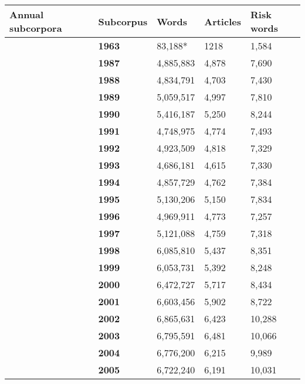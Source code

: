 	\begin{table}
	    \centering
	    \footnotesize
    \begin{tabular}{p{1.5cm}|l|l|l|l|}

\hline

\multicolumn{1}{|p{1.5cm}|}{Annual subcorpora} & \textbf{Subcorpus} & \textbf{Words} & \textbf{Articles} & \textbf{Risk words}   \\ \hline
~ & \textbf{1963} & 83,188* & 1218 &  1,584  \\ \cline{2-5}
~ & \textbf{1987} & 4,885,883 & 4,878 &  7,690  \\ \cline{2-5}
~ & \textbf{1988} & 4,834,791 & 4,703 &  7,430  \\ \cline{2-5}
~ & \textbf{1989} & 5,059,517 & 4,997 &  7,810  \\ \cline{2-5}
~ & \textbf{1990} & 5,416,187 & 5,250 &  8,244  \\ \cline{2-5}
~ & \textbf{1991} & 4,748,975 & 4,774 &  7,493  \\ \cline{2-5}
~ & \textbf{1992} & 4,923,509 & 4,818 &  7,329  \\ \cline{2-5}
~ & \textbf{1993} & 4,686,181 & 4,615 &  7,330  \\ \cline{2-5}
~ & \textbf{1994} & 4,857,729 & 4,762 &  7,384  \\ \cline{2-5}
~ & \textbf{1995} & 5,130,206 & 5,150 &  7,834  \\ \cline{2-5}
~ & \textbf{1996} & 4,969,911 & 4,773 &  7,257  \\ \cline{2-5}
~ & \textbf{1997} & 5,121,088 & 4,759 &  7,318  \\ \cline{2-5}
~ & \textbf{1998} & 6,085,810 & 5,437 &  8,351  \\ \cline{2-5}
~ & \textbf{1999} & 6,053,731 & 5,392 &  8,248  \\ \cline{2-5}
~ & \textbf{2000} & 6,472,727 & 5,717 &  8,434  \\ \cline{2-5}
~ & \textbf{2001} & 6,603,456 & 5,902 &  8,722  \\ \cline{2-5}
~ & \textbf{2002} & 6,865,631 & 6,423 & 10,288  \\ \cline{2-5}
~ & \textbf{2003} & 6,795,591 & 6,481 & 10,066  \\ \cline{2-5}
~ & \textbf{2004} & 6,776,200 & 6,215 &  9,989  \\ \cline{2-5}
~ & \textbf{2005} & 6,722,240 & 6,191 & 10,031  \\ \cline{2-5}

\end{tabular}
\end{table}
